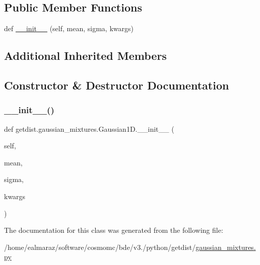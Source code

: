\subsection*{Public Member Functions}
\begin{DoxyCompactItemize}
\item 
def \mbox{\hyperlink{classgetdist_1_1gaussian__mixtures_1_1Gaussian1D_a526248c7fed6bd0e978b6a50bf53e746}{\+\_\+\+\_\+init\+\_\+\+\_\+}} (self, mean, sigma, kwargs)
\end{DoxyCompactItemize}
\subsection*{Additional Inherited Members}


\subsection{Constructor \& Destructor Documentation}
\mbox{\label{classgetdist_1_1gaussian__mixtures_1_1Gaussian1D_a526248c7fed6bd0e978b6a50bf53e746}} 
\subsubsection{\texorpdfstring{\+\_\+\+\_\+init\+\_\+\+\_\+()}{\_\_init\_\_()}}
{\footnotesize\ttfamily def getdist.\+gaussian\+\_\+mixtures.\+Gaussian1\+D.\+\_\+\+\_\+init\+\_\+\+\_\+ (\begin{DoxyParamCaption}\item[{}]{self,  }\item[{}]{mean,  }\item[{}]{sigma,  }\item[{}]{kwargs }\end{DoxyParamCaption})}



The documentation for this class was generated from the following file\+:\begin{DoxyCompactItemize}
\item 
/home/ealmaraz/software/cosmomc/bde/v3./python/getdist/\mbox{\hyperlink{gaussian__mixtures_8py}{gaussian\+\_\+mixtures.\+py}}\end{DoxyCompactItemize}
